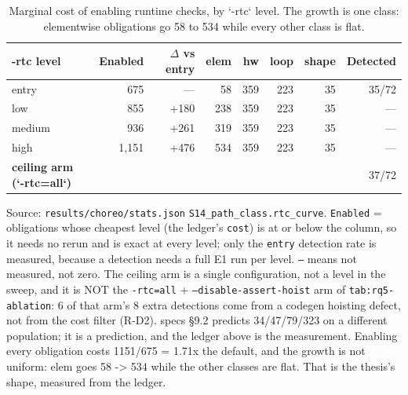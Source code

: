 \begin{table}[t]
\centering\footnotesize
\caption{Marginal cost of enabling runtime checks, by `-rtc` level. The growth is one class: elementwise obligations go 58 to 534 while every other class is flat.}
\label{tab:e1-rtc-curve}
\begin{tabular}{@{}lrrrrrrr@{}}
\toprule
-rtc level & Enabled & $\Delta$ vs entry & elem & hw & loop & shape & Detected \\
\midrule
entry & 675 & --- & 58 & 359 & 223 & 35 & 35/72 \\
low & 855 & +180 & 238 & 359 & 223 & 35 & --- \\
medium & 936 & +261 & 319 & 359 & 223 & 35 & --- \\
high & 1,151 & +476 & 534 & 359 & 223 & 35 & --- \\
\textbf{ceiling arm (`-rtc=all`)} &  &  &  &  &  &  & 37/72 \\
\bottomrule
\end{tabular}
\vspace{0.4em}\begin{minipage}{0.98\linewidth}\raggedright\footnotesize Source: \texttt{results/choreo/stats.json} \texttt{S14\_path\_class.rtc\_curve}. \texttt{Enabled} = obligations whose cheapest level (the ledger's \texttt{cost}) is at or below the column, so it needs no rerun and is exact at every level; only the \texttt{entry} detection rate is measured, because a detection needs a full E1 run per level. \texttt{---} means not measured, not zero. The ceiling arm is a single configuration, not a level in the sweep, and it is NOT the \texttt{-rtc=all} + \texttt{--disable-assert-hoist} arm of \texttt{tab:rq5-ablation}: 6 of that arm's 8 extra detections come from a codegen hoisting defect, not from the cost filter (R-D2). specs §9.2 predicts 34/47/79/323 on a different population; it is a prediction, and the ledger above is the measurement. Enabling every obligation costs 1151/675 = 1.71x the default, and the growth is not uniform: elem goes 58 -> 534 while the other classes are flat. That is the thesis's shape, measured from the ledger.\end{minipage}
\end{table}
